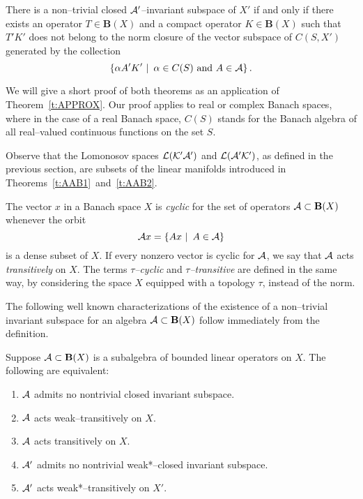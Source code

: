 \smallskip

\begin{thm}
\label{t:AAB2} There is a non--trivial closed ${\cal A}'$--invariant
subspace of $X'$ if and only if there exists an operator $T\in
\mathbf{B}(X)$ and a compact operator $K\in \mathbf{B}(X)$ such
that $T'K'$ does not belong to the norm closure of the vector
subspace of $C(S,X')$ generated by the collection
\[ \left\{\alpha A'K'\,\,|\,\,\, \alpha \in C(S) \text{ and } A \in {\cal A}\right\}. \]
\end{thm}

\medskip

We will give a short proof of both theorems as an application
of Theorem~\ref{t:APPROX}. Our proof applies to real or complex
Banach spaces, where in the case of a real Banach space, $C(S)$
stands for the Banach algebra of all real--valued continuous
functions on the set $S$.

\smallskip

Observe that the Lomonosov spaces $\cal{L}(K'{\cal A}')$ and
$\cal{L}({\cal A}'K')$, as defined in the previous section, are
subsets of the linear manifolds introduced in
Theorems~\ref{t:AAB1}~and~\ref{t:AAB2}.

\medskip

\begin{defn}
The vector $x$ in a Banach space $X$ is {\em cyclic} for the
set of operators ${\cal A}\subset \mathbf{B}(X)$ whenever the orbit
\[ {\cal A} x = \left\{Ax\,\,|\,\,\, A \in {\cal A}\right\} \]
is a dense subset of $X$. If every nonzero vector is cyclic for
${\cal A}$, we say that ${\cal A}$ acts {\em transitively} on $X$. The
terms {\em $\tau$--cyclic} and {\em $\tau$--transitive} are
defined in the same way, by considering the space $X$ equipped
with a topology $\tau$, instead of the norm.
\end{defn}

\medskip

The following well known characterizations of the existence of
a non--trivial invariant subspace for an algebra ${\cal A} \subset
\mathbf{B}(X)$ follow immediately from the definition.

\begin{prop} \label{p:ISC}
Suppose ${\cal A}\subset \mathbf{B}(X)$ is a subalgebra of bounded
linear operators on $X$. The following are equivalent:
 \begin{enumerate}
  \item ${\cal A}$ admits no nontrivial closed invariant
      subspace.
  \item ${\cal A}$ acts weak--transitively on $X$.
  \item ${\cal A}$ acts transitively on $X$.
  \item ${\cal A}'$ admits no nontrivial weak*--closed invariant
      subspace.
  \item ${\cal A}'$ acts weak*--transitively on $X'$.
 \end{enumerate}
\end{prop}

